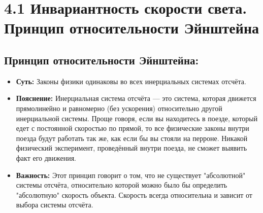 \documentclass[a4paper,12pt]{article}
\begin{document}
\begin{center}
\end{center}

\vspace{-2.5em}







\section*{4.1 Инвариантность скорости света. Принцип относительности Эйнштейна}
\vspace{-9pt}
\subsection*{Принцип относительности Эйнштейна:}
\vspace{-3pt}
\begin{itemize}
    \item \textbf{Суть:} Законы физики одинаковы во всех инерциальных системах отсчёта.
    \item \textbf{Пояснение:} Инерциальная система отсчёта — это система, которая движется прямолинейно и равномерно (без ускорения) относительно другой инерциальной системы. Проще говоря, если вы находитесь в поезде, который едет с постоянной скоростью по прямой, то все физические законы внутри поезда будут работать так же, как если бы вы стояли на перроне. Никакой физический эксперимент, проведённый внутри поезда, не сможет выявить факт его движения.
    \item \textbf{Важность:} Этот принцип говорит о том, что не существует "абсолютной" системы отсчёта, относительно которой можно было бы определить "абсолютную" скорость объекта. Скорость всегда относительна и зависит от выбора системы отсчёта.
\end{itemize}
\end{document}
